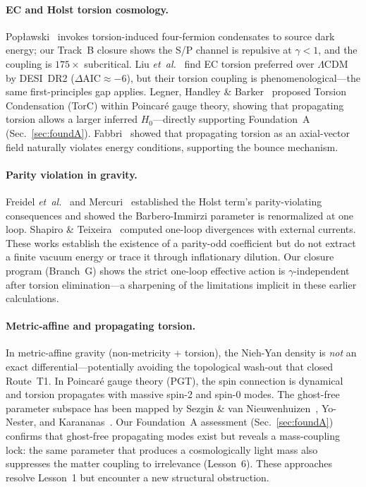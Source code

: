 \documentclass[aps,prd,twocolumn,superscriptaddress,showpacs,preprintnumbers,
  nofootinbib,longbibliography,floatfix]{revtex4-2}
\newcommand{\BI}{\gamma}
\newcommand{\etal}{\textit{et~al.}}
\begin{document}
\paragraph{EC and Holst torsion cosmology.}
Pop\l{}awski~\cite{Poplawski2012} invokes torsion-induced four-fermion
condensates to source dark energy; our Track~B closure shows the S/P
channel is repulsive at $\BI < 1$, and the coupling is $175\times$
subcritical. Liu \etal~\cite{ECTorsionDESI2025} find EC torsion
preferred over $\Lambda$CDM by DESI~DR2 ($\Delta\text{AIC}\approx-6$),
but their torsion coupling is phenomenological---the same first-principles
gap applies. Legner, Handley \& Barker~\cite{Legner2025} proposed
Torsion Condensation (TorC) within Poincar\'e gauge theory, showing
that propagating torsion allows a larger inferred $H_0$---directly
supporting Foundation~A (Sec.~\ref{sec:foundA}). Fabbri~\cite{Fabbri2025}
showed that propagating torsion as an axial-vector field naturally
violates energy conditions, supporting the bounce mechanism.

\paragraph{Parity violation in gravity.}
Freidel \etal~\cite{Freidel2005} and Mercuri~\cite{Mercuri2006,Mercuri2009}
established the Holst term's parity-violating consequences and showed the
Barbero-Immirzi parameter is renormalized at one loop. Shapiro \&
Teixeira~\cite{ShapiroTeixeira2014} computed one-loop divergences with
external currents. These works establish the existence of a parity-odd
coefficient but do not extract a finite vacuum energy or trace it through
inflationary dilution. Our closure program (Branch~G) shows the strict
one-loop effective action is $\BI$-independent after torsion
elimination---a sharpening of the limitations implicit in these
earlier calculations.

\paragraph{Metric-affine and propagating torsion.}
In metric-affine gravity (non-metricity + torsion), the Nieh-Yan
density is \textit{not} an exact differential---potentially avoiding
the topological wash-out that closed Route~T1. In Poincar\'e gauge
theory (PGT), the spin connection is dynamical and torsion propagates
with massive spin-2 and spin-0 modes. The ghost-free parameter subspace
has been mapped by Sezgin \& van
Nieuwenhuizen~\cite{SezginNieuwenhuizen1980}, Yo-Nester, and
Karananas~\cite{Karananas2015}. Our Foundation~A assessment
(Sec.~\ref{sec:foundA}) confirms that ghost-free propagating modes
exist but reveals a mass-coupling lock: the same parameter that produces
a cosmologically light mass also suppresses the matter coupling to
irrelevance (Lesson~6). These approaches resolve Lesson~1 but encounter
a new structural obstruction.
\end{document}
